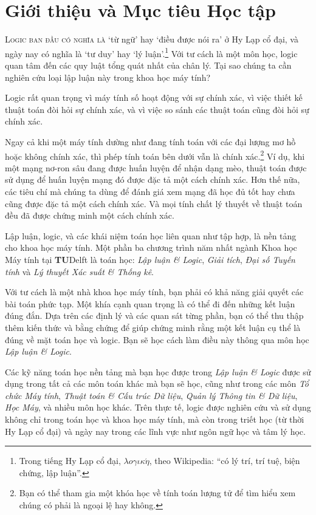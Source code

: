 \chapter{Giới thiệu và Mục tiêu Học tập}

\textsc{Logic ban đầu có nghĩa là} `từ ngữ' hay `điều được nói ra' ở Hy Lạp cổ đại, và ngày nay có nghĩa là `tư duy' hay `lý luận'.\footnote{Trong tiếng Hy Lạp cổ đại, $\lambda o\gamma\iota\kappa\acute{\eta}$, theo Wikipedia: ``có lý trí, trí tuệ, biện chứng, lập luận''.} Với tư cách là một môn học, logic quan tâm đến các quy luật tổng quát nhất của chân lý. Tại sao chúng ta cần nghiên cứu loại lập luận này trong khoa học máy tính?

Logic rất quan trọng vì máy tính số hoạt động với sự chính xác, vì việc thiết kế thuật toán đòi hỏi sự chính xác, và vì việc so sánh các thuật toán cũng đòi hỏi sự chính xác.

Ngay cả khi một máy tính dường như đang tính toán với các đại lượng mơ hồ hoặc không chính xác, thì phép tính toán bên dưới vẫn là chính xác.\footnote{Bạn có thể tham gia một khóa học về tính toán lượng tử để tìm hiểu xem chúng có phải là ngoại lệ hay không.} Ví dụ, khi một mạng nơ-ron sâu đang được huấn luyện để nhận dạng mèo, thuật toán được sử dụng để huấn luyện mạng đó được đặc tả một cách chính xác. Hơn thế nữa, các tiêu chí mà chúng ta dùng để đánh giá xem mạng đã học đủ tốt hay chưa cũng được đặc tả một cách chính xác. Và mọi tính chất lý thuyết về thuật toán đều đã được chứng minh một cách chính xác.

Lập luận, logic, và các khái niệm toán học liên quan như tập hợp, là nền tảng cho khoa học máy tính. Một phần ba chương trình năm nhất ngành Khoa học Máy tính tại \textbf{TU}Delft là toán học: \textit{Lập luận \& Logic}, \textit{Giải tích}, \textit{Đại số Tuyến tính} và \textit{Lý thuyết Xác suất \& Thống kê}.

Với tư cách là một nhà khoa học máy tính, bạn phải có khả năng giải quyết các bài toán phức tạp. Một khía cạnh quan trọng là có thể đi đến những kết luận đúng đắn. Dựa trên các định lý và các quan sát từng phần, bạn có thể thu thập thêm kiến thức và bằng chứng để giúp chứng minh rằng một kết luận cụ thể là đúng về mặt toán học và logic. Bạn sẽ học cách làm điều này thông qua môn học \textit{Lập luận \& Logic}.

Các kỹ năng toán học nền tảng mà bạn học được trong \textit{Lập luận \& Logic} được sử dụng trong tất cả các môn toán khác mà bạn sẽ học, cũng như trong các môn \textit{Tổ chức Máy tính}, \textit{Thuật toán \& Cấu trúc Dữ liệu}, \textit{Quản lý Thông tin \& Dữ liệu}, \textit{Học Máy}, và nhiều môn học khác. Trên thực tế, logic được nghiên cứu và sử dụng không chỉ trong toán học và khoa học máy tính, mà còn trong triết học (từ thời Hy Lạp cổ đại) và ngày nay trong các lĩnh vực như ngôn ngữ học và tâm lý học.

